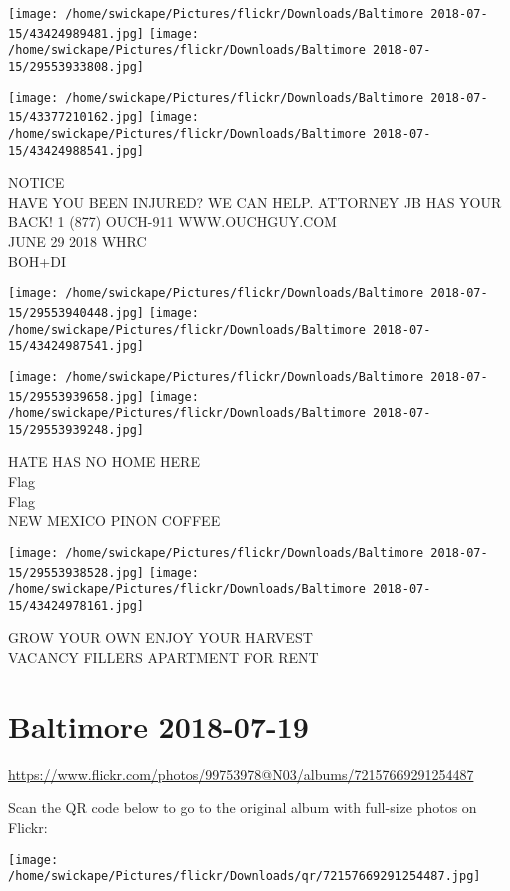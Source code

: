 \documentclass[10pt,letterpaper]{article}
\begin{document}
\texttt{[image: /home/swickape/Pictures/flickr/Downloads/Baltimore 2018-07-15/43424989481.jpg]}
\texttt{[image: /home/swickape/Pictures/flickr/Downloads/Baltimore 2018-07-15/29553933808.jpg]}

\texttt{[image: /home/swickape/Pictures/flickr/Downloads/Baltimore 2018-07-15/43377210162.jpg]}
\texttt{[image: /home/swickape/Pictures/flickr/Downloads/Baltimore 2018-07-15/43424988541.jpg]}

NOTICE\\
HAVE YOU BEEN INJURED?  WE CAN HELP.  ATTORNEY JB HAS YOUR BACK!  1 (877) OUCH{-}911 WWW.OUCHGUY.COM\\
JUNE 29 2018 WHRC\\
BOH+DI
\pagebreak

\texttt{[image: /home/swickape/Pictures/flickr/Downloads/Baltimore 2018-07-15/29553940448.jpg]}
\texttt{[image: /home/swickape/Pictures/flickr/Downloads/Baltimore 2018-07-15/43424987541.jpg]}

\texttt{[image: /home/swickape/Pictures/flickr/Downloads/Baltimore 2018-07-15/29553939658.jpg]}
\texttt{[image: /home/swickape/Pictures/flickr/Downloads/Baltimore 2018-07-15/29553939248.jpg]}

HATE HAS NO HOME HERE\\
Flag\\
Flag\\
NEW MEXICO PINON COFFEE
\pagebreak

\texttt{[image: /home/swickape/Pictures/flickr/Downloads/Baltimore 2018-07-15/29553938528.jpg]}
\texttt{[image: /home/swickape/Pictures/flickr/Downloads/Baltimore 2018-07-15/43424978161.jpg]}

GROW YOUR OWN ENJOY YOUR HARVEST\\
VACANCY FILLERS APARTMENT FOR RENT
\pagebreak

\section*{Baltimore 2018-07-19}

\url{https://www.flickr.com/photos/99753978@N03/albums/72157669291254487}

Scan the QR code below to go to the original album with full-size photos on Flickr:

\texttt{[image: /home/swickape/Pictures/flickr/Downloads/qr/72157669291254487.jpg]}
\pagebreak
\end{document}

